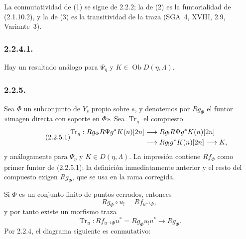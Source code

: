 La conmutatividad de (1) se sigue de 2.2.2; la de (2) es la funtorialidad de
(2.1.10.2), y la de (3) es la transitividad de la traza (SGA~4, XVIII, 2.9,
Variante~3).

\subsubsection*{2.2.4.1.}
Hay un resultado análogo para $\Psi_\eta$ y
$K\in\operatorname{Ob}D(\eta,\Lambda)$.

\subsubsection*{2.2.5.}
Sea $\Phi$ un subconjunto de $Y_s$ propio sobre $s$, y denotemos por
$Rg_\Phi$ el funtor «imagen directa con soporte en $\Phi$». Sea
$\operatorname{Tr}_g$ el compuesto
\begin{equation}\tag{2.2.5.1}
\begin{split}
\operatorname{Tr}_g:
\sisi{Rf_\Phi}{Rg_\Phi} R\Psi g^*K(n)[2n]
&\longrightarrow Rg_!R\Psi g^*K(n)[2n] \\
&\longrightarrow Rg_!g^*K(n)[2n]
\longrightarrow K,
\end{split}
\end{equation}
y análogamente para $\Psi_\eta$ y $K\in D(\eta,\Lambda)$. La impresión
contiene $Rf_\Phi$ como primer funtor de (2.2.5.1); la definición
inmediatamente anterior y el resto del compuesto exigen $Rg_\Phi$, que se usa
en la rama corregida.

Si $\Phi$ es un conjunto finito de puntos cerrados, entonces
\[
Rg_\Phi\circ u_!=Rf_{u^{-1}\Phi},
\]
y por tanto existe un morfismo traza
\[
\operatorname{Tr}_u:
Rf_{u^{-1}\Phi}u^*=Rg_\Phi u_!u^*\longrightarrow Rg_\Phi.
\]
Por 2.2.4, el diagrama siguiente es conmutativo:
\begin{center}
\end{center}

